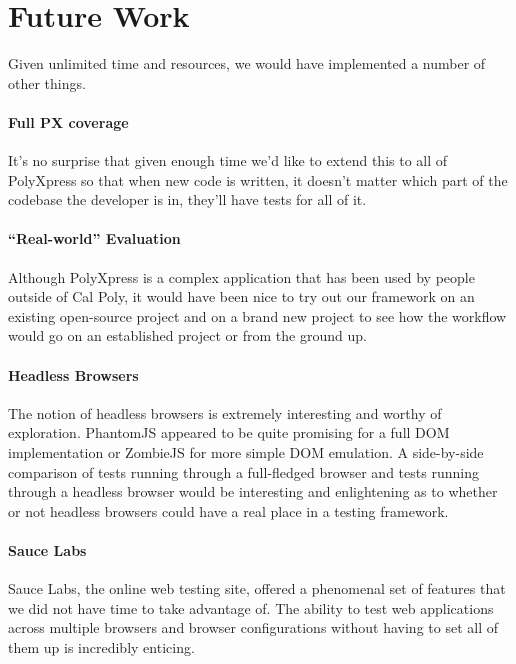 \documentclass[12pt]{ucthesis}
\begin{document}
\chapter{Future Work}
Given unlimited time and resources, we would have implemented a number of other things.

\subsubsection{Full PX coverage}
It's no surprise that given enough time we'd like to extend this to all of PolyXpress so that when new code is written, it doesn't matter which part of the codebase the developer is in, they'll have tests for all of it.

\subsubsection{``Real-world'' Evaluation}
Although PolyXpress is a complex application that has been used by people outside of Cal Poly, it would have been nice to try out our framework on an existing open-source project and on a brand new project to see how the workflow would go on an established project or from the ground up.

\subsubsection{Headless Browsers}
The notion of headless browsers is extremely interesting and worthy of exploration. PhantomJS appeared to be quite promising for a full DOM implementation or ZombieJS for more simple DOM emulation. A side-by-side comparison of tests running through a full-fledged browser and tests running through a headless browser would be interesting and enlightening as to whether or not headless browsers could have a real place in a testing framework.

\subsubsection{Sauce Labs}
Sauce Labs, the online web testing site, offered a phenomenal set of features that we did not have time to take advantage of. The ability to test web applications across multiple browsers and browser configurations without having to set all of them up is incredibly enticing.

\end{document}

